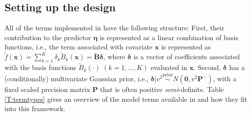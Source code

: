 \documentclass[article, shortnames, nojss, noheadings, notitle]{jss}
\newcommand{\priorsim}{\stackrel{\text{prior}}{\sim}}
\newcommand{\iid} {\operatorname{i.i.d.}}
\begin{document}
\subsection{Setting up the design}\label{design}
All of the terms implemented in  have the following structure:
First, their contribution to the predictor $\bm \eta$ is represented as a linear combination of basis functions,
i.e., the
term associated with covariate $\bm x$ is represented as
$\tilde f(\bm x) = \sum_{k=1}^K \delta_{k}\tilde B_k(\bm x)= \bm{\tilde{B}} \bm \delta$,
where $\bm\delta$ is a vector of coefficients associated with
the basis functions $\tilde B_k(\cdot)\;( k=1,\ldots,K)$ evaluated in $\bm x$.
Second, $\bm\delta$ has a (conditionally) multivariate Gaussian prior, i.e., $\bm\delta|v^2 \priorsim N(\bm 0, v^2\bm P^-)$,
with a fixed scaled precision matrix $\bm P$ that is often positive \emph{semi}-definite.
Table \ref{T:termtypes} gives an overview of the model terms available in  and how they fit into this
framework.
\end{document}
